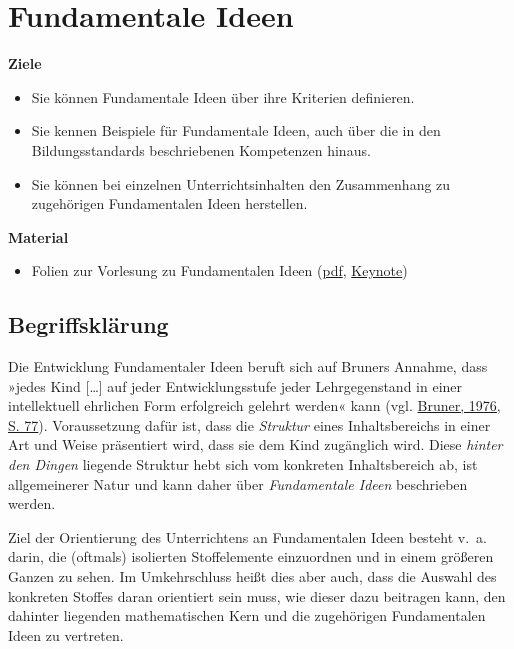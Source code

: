 \documentclass[
]{scrbook}
\providecommand{\tightlist}{%
  \setlength{\itemsep}{0pt}\setlength{\parskip}{0pt}}
\renewenvironment{quote}{
  \list{}{
	\leftmargin0.2cm   %
    \rightmargin\leftmargin
      	\def\FrameCommand
    {%
        {\color{quoteColor}\vrule width 2pt}%
        \hspace{0pt}%
    }%
    \MakeFramed{\advance \hsize -\width \FrameRestore}    \color{quoteColor}
    }
  \item\relax
}
{\endlist\color{black}\endMakeFramed}
\theoremstyle{definition}
\theoremstyle{definition}
\theoremstyle{definition}
\theoremstyle{definition}
\theoremstyle{remark}
\begin{document}
\hypertarget{fundamentale-ideen}{%
\chapter{Fundamentale Ideen}\label{fundamentale-ideen}}

\begin{quote}
\textbf{Ziele}

\begin{itemize}
\tightlist
\item
  Sie können Fundamentale Ideen über ihre Kriterien definieren.
\item
  Sie kennen Beispiele für Fundamentale Ideen, auch über die in den Bildungsstandards beschriebenen Kompetenzen hinaus.
\item
  Sie können bei einzelnen Unterrichtsinhalten den Zusammenhang zu zugehörigen Fundamentalen Ideen herstellen.
\end{itemize}

\textbf{Material}

\begin{itemize}
\tightlist
\item
  Folien zur Vorlesung zu Fundamentalen Ideen (\href{files/Stoffdidaktik-WiSe2223-Kap2.pdf}{pdf}, \href{files/Stoffdidaktik-WiSe2223-Kap2.key}{Keynote})
\end{itemize}
\end{quote}

\hypertarget{fundamentale-ideen-begriffsklaerung}{%
\section{Begriffsklärung}\label{fundamentale-ideen-begriffsklaerung}}

Die Entwicklung Fundamentaler Ideen beruft sich auf Bruners Annahme, dass »jedes Kind {[}\ldots{]} auf jeder Entwicklungsstufe jeder Lehrgegenstand in einer intellektuell ehrlichen Form erfolgreich gelehrt werden« kann (vgl. \protect\hyperlink{ref-Bruner:1976}{Bruner, 1976, S. 77}). Voraussetzung dafür ist, dass die \emph{Struktur} eines Inhaltsbereichs in einer Art und Weise präsentiert wird, dass sie dem Kind zugänglich wird. Diese \emph{hinter den Dingen} liegende Struktur hebt sich vom konkreten Inhaltsbereich ab, ist allgemeinerer Natur und kann daher über \emph{Fundamentale Ideen} beschrieben werden.

Ziel der Orientierung des Unterrichtens an Fundamentalen Ideen besteht v.~a. darin, die (oftmals) isolierten Stoffelemente einzuordnen und in einem größeren Ganzen zu sehen. Im Umkehrschluss heißt dies aber auch, dass die Auswahl des konkreten Stoffes daran orientiert sein muss, wie dieser dazu beitragen kann, den dahinter liegenden mathematischen Kern und die zugehörigen Fundamentalen Ideen zu vertreten.
\end{document}
